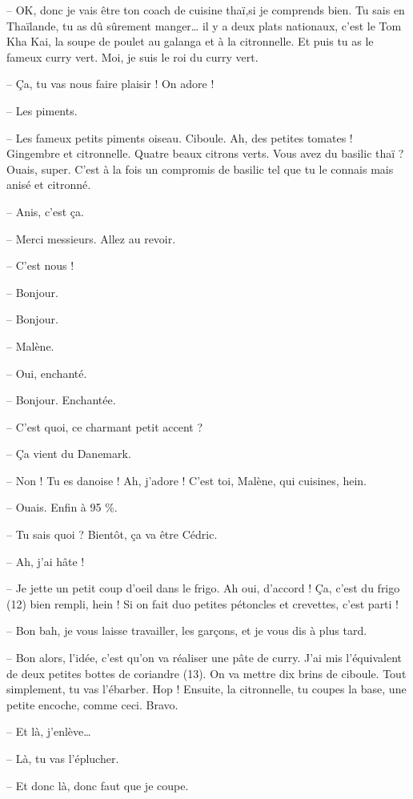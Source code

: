 \documentclass[11pt, french]{report}
\begin{document}
-- OK, donc je vais être ton coach de cuisine thaï,si je comprends bien. Tu sais
en Thaïlande, tu as dû sûrement manger… il y a deux plats nationaux, c’est le
Tom Kha Kai, la soupe de poulet au galanga et à la citronnelle. Et puis tu as le
fameux curry vert. Moi, je suis le roi du curry vert.

-- Ça, tu vas nous faire plaisir ! On adore !

-- Les piments.

-- Les fameux petits piments oiseau. Ciboule. Ah, des petites tomates ! Gingembre
et citronnelle. Quatre beaux citrons verts. Vous avez du basilic thaï ? Ouais,
super. C’est à la fois un compromis de basilic tel que tu le connais mais anisé
et citronné.

-- Anis, c’est ça.

-- Merci messieurs. Allez au revoir.

-- C’est nous !

-- Bonjour.

-- Bonjour.

-- Malène.

-- Oui, enchanté.

-- Bonjour. Enchantée.

-- C’est quoi, ce charmant petit accent ?

-- Ça vient du Danemark.

-- Non ! Tu es danoise ! Ah, j’adore ! C’est toi, Malène, qui cuisines, hein.

-- Ouais. Enfin à 95 \%.

-- Tu sais quoi ? Bientôt, ça va être Cédric.

-- Ah, j’ai hâte !

-- Je jette un petit coup d’oeil dans le frigo. Ah oui, d’accord ! Ça, c’est
du frigo (12) bien rempli, hein ! Si on fait duo petites pétoncles et crevettes,
c’est parti !

-- Bon bah, je vous laisse travailler, les garçons, et je vous dis à plus tard.

-- Bon alors, l’idée, c’est qu’on va réaliser une pâte de curry. J’ai mis
l’équivalent de deux petites bottes de coriandre (13). On va mettre dix brins
de ciboule. Tout simplement, tu vas l’ébarber. Hop ! Ensuite, la citronnelle,
tu coupes la base, une petite encoche, comme ceci. Bravo.

-- Et là, j’enlève…

-- Là, tu vas l’éplucher.

-- Et donc là, donc faut que je coupe.
\end{document}
